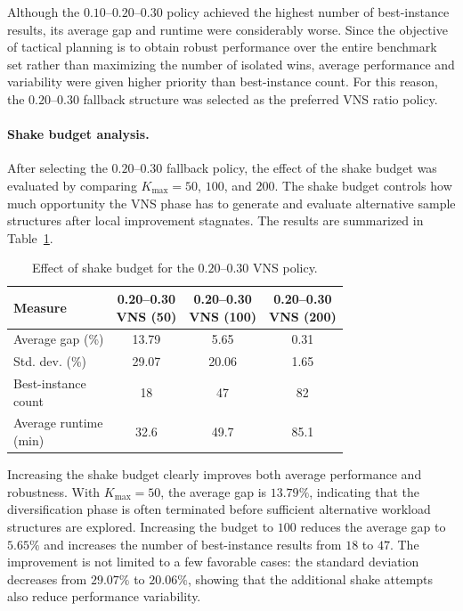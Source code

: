 Although the \(0.10\)--\(0.20\)--\(0.30\) policy achieved the highest number of best-instance results, its average gap and runtime were considerably worse. Since the objective of tactical planning is to obtain robust performance over the entire benchmark set rather than maximizing the number of isolated wins, average performance and variability were given higher priority than best-instance count. For this reason, the \(0.20\)--\(0.30\) fallback structure was selected as the preferred VNS ratio policy.

\paragraph{Shake budget analysis.}

After selecting the \(0.20\)--\(0.30\) fallback policy, the effect of the shake budget was evaluated by comparing \(K_{\max}=50\), \(100\), and \(200\). The shake budget controls how much opportunity the VNS phase has to generate and evaluate alternative sample structures after local improvement stagnates. The results are summarized in Table~\ref{tab:vns_budget_comparison}.

\begin{table}[H]
\centering
\caption{Effect of shake budget for the \(0.20\)--\(0.30\) VNS policy.}
\label{tab:vns_budget_comparison}
\begin{tabular}{lccc}
\hline
\textbf{Measure}
& \shortstack{\textbf{0.20--0.30}\\\textbf{VNS (50)}}
& \shortstack{\textbf{0.20--0.30}\\\textbf{VNS (100)}}
& \shortstack{\textbf{0.20--0.30}\\\textbf{VNS (200)}} \\
\hline
Average gap (\%) & 13.79 & 5.65 & 0.31 \\
Std. dev. (\%) & 29.07 & 20.06 & 1.65 \\
\shortstack[l]{Best-instance\\count} & 18 & 47 & 82 \\
\shortstack[l]{Average runtime\\(min)} & 32.6 & 49.7 & 85.1 \\
\hline
\end{tabular}
\end{table}

Increasing the shake budget clearly improves both average performance and robustness. With \(K_{\max}=50\), the average gap is \(13.79\%\), indicating that the diversification phase is often terminated before sufficient alternative workload structures are explored. Increasing the budget to \(100\) reduces the average gap to \(5.65\%\) and increases the number of best-instance results from \(18\) to \(47\). The improvement is not limited to a few favorable cases: the standard deviation decreases from \(29.07\%\) to \(20.06\%\), showing that the additional shake attempts also reduce performance variability.

